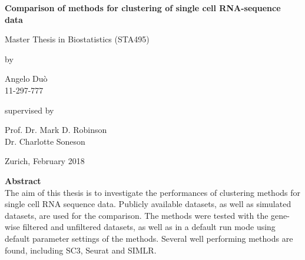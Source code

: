 \documentclass[12pt, a4paper]{article}\usepackage[]{graphicx}\usepackage[]{color}
\begin{document}

\thispagestyle{empty}
\renewcommand{\baselinestretch}{1.5}\normalfont
\begin{center}
\setlength{\parindent}{0cm}
\bf\Large%
Comparison of methods for clustering of single cell RNA-sequence data \\

\normalfont



\hrulefill

\vspace*{4cm}

\large
Master Thesis in Biostatistics (STA495)
\vspace*{12mm}

by

\vspace*{12mm}

Angelo Du\`o\\
\small 11-297-777\\
\normalfont
\vspace*{4cm}

supervised by

\vspace*{1cm}

Prof. Dr. Mark D. Robinson\\
Dr. Charlotte Soneson

\vfill

Zurich, February 2018
\end{center}
\renewcommand\familydefault{\rmdefault}%
\renewcommand{\baselinestretch}{1.0}\rm 
\setcounter{page}{0}
\cleardoublepage
\newpage\null\thispagestyle{empty}\newpage

\newpage
\setcounter{page}{0}

{\Large\textbf{Abstract}}\\


The aim of this thesis is to investigate the performances of clustering methods for single cell RNA sequence data. Publicly available datasets, as well as simulated datasets, are used for the comparison. The methods were tested with the gene-wise filtered and unfiltered datasets, as well as in a default run mode using default parameter settings of the methods. Several well performing methods are found, including SC3, Seurat and SIMLR. 
\newpage
\tableofcontents
\setcounter{page}{0}
\end{document}
